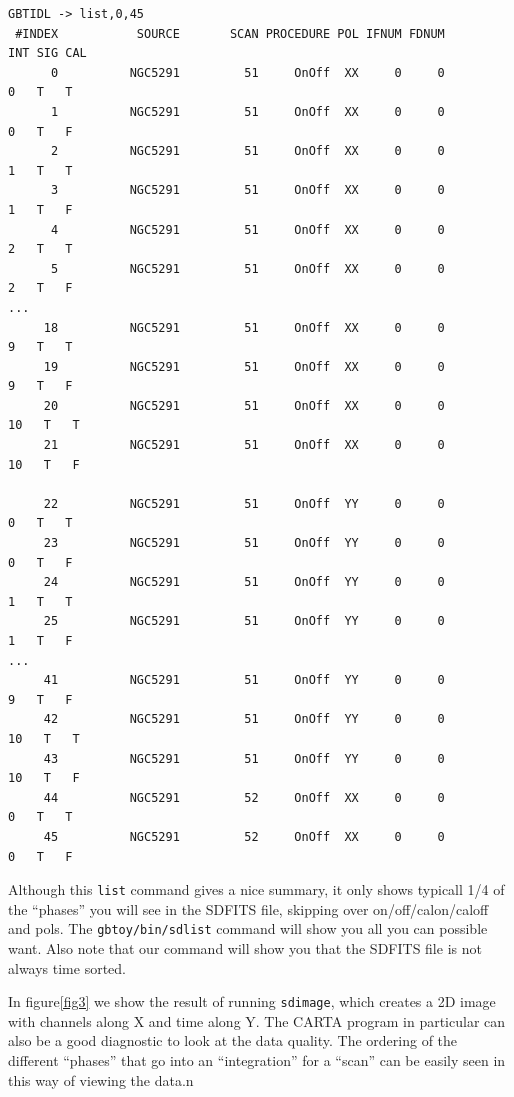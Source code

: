 \documentclass[12pt,a4paper]{article}
\begin{document}
\begin{lstlisting}
GBTIDL -> list,0,45
 #INDEX           SOURCE       SCAN PROCEDURE POL IFNUM FDNUM        INT SIG CAL
      0          NGC5291         51     OnOff  XX     0     0          0   T   T
      1          NGC5291         51     OnOff  XX     0     0          0   T   F
      2          NGC5291         51     OnOff  XX     0     0          1   T   T
      3          NGC5291         51     OnOff  XX     0     0          1   T   F
      4          NGC5291         51     OnOff  XX     0     0          2   T   T
      5          NGC5291         51     OnOff  XX     0     0          2   T   F
...
     18          NGC5291         51     OnOff  XX     0     0          9   T   T
     19          NGC5291         51     OnOff  XX     0     0          9   T   F
     20          NGC5291         51     OnOff  XX     0     0         10   T   T
     21          NGC5291         51     OnOff  XX     0     0         10   T   F
     
     22          NGC5291         51     OnOff  YY     0     0          0   T   T
     23          NGC5291         51     OnOff  YY     0     0          0   T   F
     24          NGC5291         51     OnOff  YY     0     0          1   T   T
     25          NGC5291         51     OnOff  YY     0     0          1   T   F
...
     41          NGC5291         51     OnOff  YY     0     0          9   T   F
     42          NGC5291         51     OnOff  YY     0     0         10   T   T
     43          NGC5291         51     OnOff  YY     0     0         10   T   F
     44          NGC5291         52     OnOff  XX     0     0          0   T   T
     45          NGC5291         52     OnOff  XX     0     0          0   T   F
\end{lstlisting}

Although this {\tt list} command gives a nice summary, it only shows typicall 1/4 of the ``phases'' you will see
in the SDFITS file, skipping over on/off/calon/caloff and pols.
The {\tt gbtoy/bin/sdlist} command will show you all you can possible want. Also note that our command will show you
that the SDFITS file is not always time sorted.

In figure\ref{fig3} we show the result of running {\tt sdimage}, which creates a 2D image with channels along X and
time along Y. The CARTA program in particular can also be a good diagnostic to look at the data quality.
The ordering of the  different ``phases'' that go into an ``integration'' for a ``scan'' can be easily seen
in this way of viewing the data.n
\end{document}
